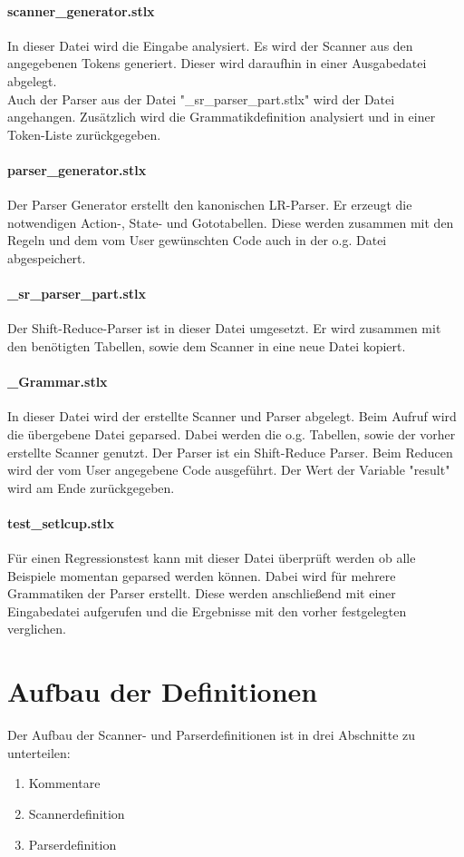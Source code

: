 \paragraph{scanner\_generator.stlx} In dieser Datei wird die Eingabe analysiert. Es wird der Scanner aus den angegebenen Tokens generiert. Dieser wird daraufhin in einer Ausgabedatei abgelegt. \\
Auch der Parser aus der Datei "\_sr\_parser\_part.stlx" wird der Datei angehangen. Zusätzlich wird die Grammatikdefinition analysiert und  in einer Token-Liste zurückgegeben.
\paragraph{parser\_generator.stlx} Der Parser Generator erstellt den kanonischen LR-Parser. Er erzeugt die notwendigen Action-, State- und Gototabellen. Diese werden zusammen mit den Regeln und dem vom User gewünschten Code auch in der o.g. Datei abgespeichert. 
\paragraph{\_sr\_parser\_part.stlx} Der Shift-Reduce-Parser ist in dieser Datei umgesetzt. Er wird zusammen mit den benötigten Tabellen, sowie dem Scanner in eine neue Datei kopiert. 
\paragraph{\_Grammar.stlx} In dieser Datei wird der erstellte Scanner und Parser abgelegt. Beim Aufruf wird die übergebene Datei geparsed. Dabei werden die o.g. Tabellen, sowie der vorher erstellte Scanner genutzt. Der Parser ist ein Shift-Reduce Parser. Beim Reducen wird der vom User angegebene Code ausgeführt. Der Wert der Variable "result" wird am Ende zurückgegeben.
\paragraph{test\_setlcup.stlx} Für einen Regressionstest kann mit dieser Datei überprüft werden ob alle Beispiele momentan geparsed werden können. Dabei wird für mehrere Grammatiken der Parser erstellt. Diese werden anschließend mit einer Eingabedatei aufgerufen und die Ergebnisse mit den vorher festgelegten verglichen.
\section{Aufbau der Definitionen}

Der Aufbau der Scanner- und Parserdefinitionen ist in drei Abschnitte zu unterteilen:
\begin{enumerate}
	\item Kommentare
	\item Scannerdefinition
	\item Parserdefinition
\end{enumerate}

